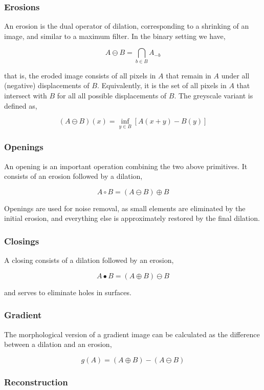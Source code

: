 \documentclass[11pt]{amsart}
\begin{document}
\subsubsection{Erosions}

An erosion is the dual operator of dilation, corresponding to a shrinking of an image, and similar to a maximum filter. In the binary setting we have,

$$A \ominus B = \bigcap_{b \in B} A_{-b}$$

that is, the eroded image consists of all pixels in $A$ that remain in $A$ under all (negative) displacements of $B$. Equivalently, it is the set of all pixels in $A$ that intersect with $B$ for all all possible displacements of $B$. The greyscale variant is defined as,

$$(A \ominus B)(x) = \inf_{y \in B}[A(x + y) - B(y)]$$

\subsubsection{Openings}

An opening is an important operation combining the two above primitives. It consists of an erosion followed by a dilation,

$$A \circ B = (A \ominus B) \oplus B$$

Openings are used for noise removal, as small elements are eliminated by the initial erosion, and everything else is approximately restored by the final dilation.

\subsubsection{Closings}

A closing consists of a dilation followed by an erosion,

$$A \bullet B = (A \oplus B) \ominus B$$

and serves to eliminate holes in surfaces.

\subsubsection{Gradient}

The morphological version of a gradient image can be calculated as the difference between a dilation and an erosion,

$$g(A) = (A \oplus B) - (A \ominus B)$$

\subsubsection{Reconstruction}
\end{document}
